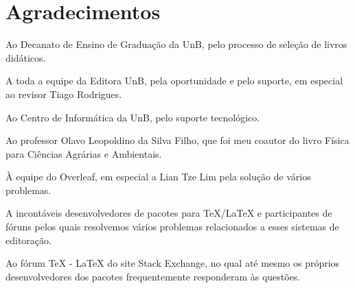 \chapter*{Agradecimentos}
\thispagestyle{empty}

\hfill %

Ao Decanato de Ensino de Graduação da UnB, pelo processo de seleção de livros didáticos.

A toda a equipe da Editora UnB, pela oportunidade e pelo suporte, em especial ao revisor Tiago Rodrigues.

Ao Centro de Informática da UnB, pelo suporte tecnológico.

Ao professor Olavo Leopoldino da Silva Filho, que foi meu coautor do livro Física para Ciências Agrárias e Ambientais.

À equipe do Overleaf, em especial a Lian Tze Lim pela solução de vários problemas.

A incontáveis desenvolvedores de pacotes para TeX/LaTeX e participantes de fóruns pelos quais resolvemos vários problemas relacionados a esses sistemas de editoração.

Ao fórum TeX - LaTeX do site Stack Exchange, no qual até mesmo os próprios desenvolvedores dos pacotes frequentemente responderam às questões.